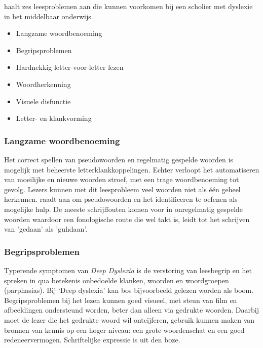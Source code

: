 
\textcite{Filipak2020} haalt zes leesproblemen aan die kunnen voorkomen bij een scholier met dyslexie in het middelbaar onderwijs.

\begin{itemize}
	\item Langzame woordbenoeming
	\item Begripsproblemen
	\item Hardnekkig letter-voor-letter lezen
	\item Woordherkenning
	\item Visuele disfunctie
	\item Letter- en klankvorming
\end{itemize}

\subsubsection{Langzame woordbenoeming}

Het correct spellen van pseudowoorden en regelmatig gespelde woorden is mogelijk met beheerste letterklankkoppelingen. Echter verloopt het automatiseren van moeilijke en nieuwe woorden stroef, met een trage woordbenoeming tot gevolg. Lezers kunnen met dit leesprobleem veel woorden niet als één geheel herkennen. \textcite{Filipak2020} raadt aan om pseudowoorden en het identificeren te oefenen als mogelijke hulp. De meeste schrijffouten komen voor in onregelmatig gespelde woorden waardoor een fonologische route die wel takt is, leidt tot het schrijven van 'gedaan' als 'guhdaan'.


\subsubsection{Begripsproblemen}

Typerende symptomen van \textit{Deep Dyslexia} is de verstoring van leesbegrip en het spreken in qua betekenis onbedoelde klanken, woorden en woordgroepen (parphasias). Bij ‘Deep dyslexia’ kan bos bijvoorbeeld gelezen worden als boom. Begripsproblemen bij het lezen kunnen goed visueel, met steun van film en afbeeldingen ondersteund worden, beter dan alleen via gedrukte woorden. Daarbij moet de lezer die het gedrukte woord wil ontcijferen, gebruik kunnen maken van bronnen van kennis op een hoger niveau: een grote woordenschat en een goed redeneervermogen. Schriftelijke expressie is uit den boze.

